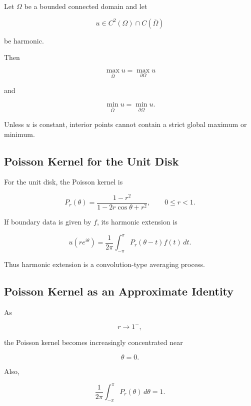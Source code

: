 \begin{theorem}
Let \(\Omega\) be a bounded connected domain and let

\[
u\in C^2(\Omega)\cap C(\overline{\Omega})
\]

be harmonic.

Then

\[
\boxed{
\max_{\overline{\Omega}}u
=
\max_{\partial\Omega}u
}
\]

and

\[
\boxed{
\min_{\overline{\Omega}}u
=
\min_{\partial\Omega}u.
}
\]
\end{theorem}

Unless \(u\) is constant, interior points cannot contain a strict global
maximum or minimum.

\subsection{Poisson Kernel for the Unit Disk}
\label{subsec:poisson-kernel-disk}

For the unit disk, the Poisson kernel is

\[
\boxed{
P_r(\theta)
=
\frac{1-r^2}
{
1-2r\cos\theta+r^2
},
\qquad
0\leq r<1.
}
\]

If boundary data is given by \(f\), its harmonic extension is

\[
\boxed{
u(re^{i\theta})
=
\frac{1}{2\pi}
\int_{-\pi}^{\pi}
P_r(\theta-t)f(t)\,dt.
}
\]

Thus harmonic extension is a convolution-type averaging process.

\subsection{Poisson Kernel as an Approximate Identity}
\label{subsec:poisson-approximate-identity}

As

\[
r\to1^-,
\]

the Poisson kernel becomes increasingly concentrated near

\[
\theta=0.
\]

Also,

\[
\boxed{
\frac{1}{2\pi}
\int_{-\pi}^{\pi}
P_r(\theta)\,d\theta
=
1.
}
\]

